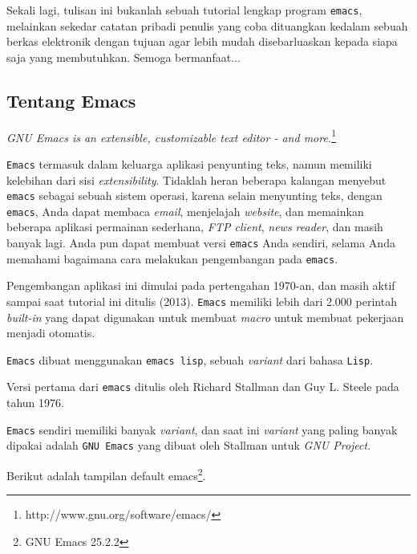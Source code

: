 \documentclass{article}
\begin{document}
Sekali lagi, tulisan ini bukanlah sebuah tutorial lengkap 
program \verb=emacs=, melainkan sekedar catatan pribadi penulis
yang coba dituangkan kedalam sebuah berkas elektronik dengan 
tujuan agar lebih mudah disebarluaskan kepada siapa saja yang
membutuhkan. Semoga bermanfaat...

\subsection{Tentang Emacs}

\emph{GNU Emacs is an extensible, customizable text editor - and more.}\footnote{http://www.gnu.org/software/emacs/}

\verb=Emacs= termasuk dalam keluarga aplikasi penyunting teks,
namun memiliki kelebihan dari sisi \emph{extensibility}. Tidaklah
heran beberapa kalangan menyebut \verb=emacs= sebagai sebuah sistem
operasi, karena selain menyunting teks, dengan \verb=emacs=, Anda dapat
membaca \emph{email}, menjelajah \emph{website}, dan memainkan 
beberapa aplikasi permainan sederhana, \emph{FTP client}, \emph{news reader},
dan masih banyak lagi. Anda pun dapat membuat versi \verb=emacs= Anda sendiri,
selama Anda memahami bagaimana cara melakukan pengembangan pada \verb=emacs=.

Pengembangan aplikasi ini dimulai pada pertengahan 1970-an, dan 
masih aktif sampai saat tutorial ini ditulis (2013). \verb=Emacs=
memiliki lebih dari 2.000 perintah \emph{built-in} yang dapat
digunakan untuk membuat \emph{macro} untuk membuat pekerjaan
menjadi otomatis.

\verb=Emacs= dibuat menggunakan \verb=emacs lisp=, sebuah
\emph{variant} dari bahasa \verb=Lisp=.

Versi pertama dari \verb=emacs= ditulis oleh Richard Stallman dan
Guy L. Steele pada tahun 1976.

\verb=Emacs= sendiri memiliki banyak \emph{variant}, dan saat ini
\emph{variant} yang paling banyak dipakai adalah \verb=GNU Emacs=
yang dibuat oleh Stallman untuk \emph{GNU Project}.

Berikut adalah tampilan default emacs\footnote{GNU Emacs 25.2.2}.

\vspace{12pt}
\end{document}
